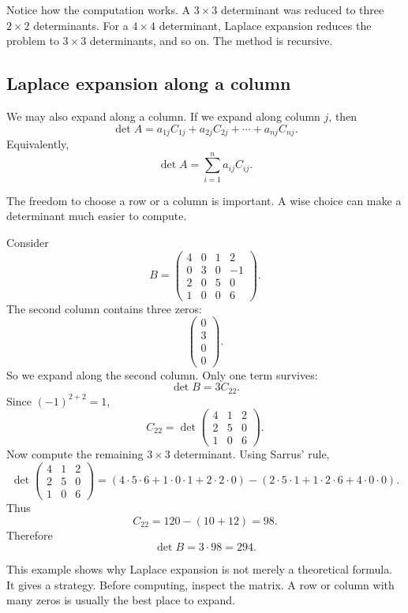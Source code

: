 Notice how the computation works. A \(3\times3\) determinant was reduced to three \(2\times2\) determinants. For a \(4\times4\) determinant, Laplace expansion reduces the problem to \(3\times3\) determinants, and so on. The method is recursive.

\subsection{Laplace expansion along a column}

We may also expand along a column. If we expand along column \(j\), then
\[
\det A=a_{1j}C_{1j}+a_{2j}C_{2j}+\cdots+a_{nj}C_{nj}.
\]
Equivalently,
\[
\det A=\sum_{i=1}^{n}a_{ij}C_{ij}.
\]

The freedom to choose a row or a column is important. A wise choice can make a determinant much easier to compute.

\begin{examplebox}
Consider
\[
B=\begin{pmatrix}
4&0&1&2\\
0&3&0&-1\\
2&0&5&0\\
1&0&0&6
\end{pmatrix}.
\]
The second column contains three zeros:
\[
\begin{pmatrix}0\\3\\0\\0\end{pmatrix}.
\]
So we expand along the second column. Only one term survives:
\[
\det B=3C_{22}.
\]
Since \((-1)^{2+2}=1\),
\[
C_{22}=\det\begin{pmatrix}
4&1&2\\
2&5&0\\
1&0&6
\end{pmatrix}.
\]
Now compute the remaining \(3\times3\) determinant. Using Sarrus' rule,
\[
\det\begin{pmatrix}
4&1&2\\
2&5&0\\
1&0&6
\end{pmatrix}
=(4\cdot5\cdot6+1\cdot0\cdot1+2\cdot2\cdot0)
-(2\cdot5\cdot1+1\cdot2\cdot6+4\cdot0\cdot0).
\]
Thus
\[
C_{22}=120-(10+12)=98.
\]
Therefore
\[
\det B=3\cdot98=294.
\]
\end{examplebox}

This example shows why Laplace expansion is not merely a theoretical formula. It gives a strategy. Before computing, inspect the matrix. A row or column with many zeros is usually the best place to expand.

